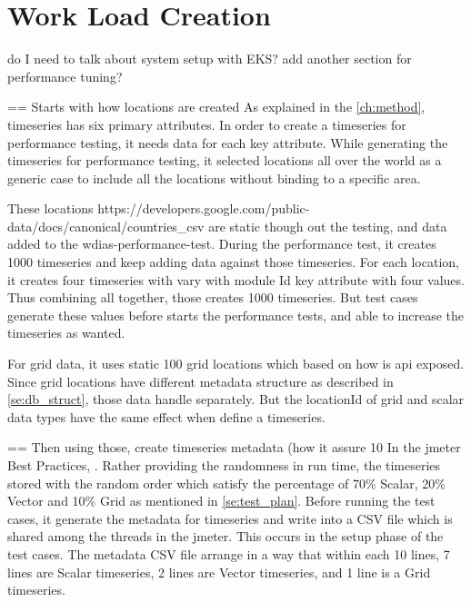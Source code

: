 \section{Work Load Creation}
do I need to talk about system setup with EKS?
add another section for performance tuning?

== Starts with how locations are created
As explained in the \ref{ch:method}, timeseries has six primary attributes. In order to create a timeseries for performance testing, it needs data for each key attribute.
While generating the timeseries for performance testing, it selected locations all over the world as a generic case to include all the locations without binding to a specific area.

These locations https://developers.google.com/public-data/docs/canonical/countries\_csv are static though out the testing, and data added to the wdias-performance-test.
During the performance test, it creates 1000 timeseries and keep adding data against those timeseries. For each location, it creates four timeseries with vary with module Id key attribute with four values. Thus combining all together, those creates 1000 timeseries. But test cases generate these values before starts the performance tests, and able to increase the timeseries as wanted.

For grid data, it uses static 100 grid locations which based on how is \acrshort{api} exposed. Since grid locations have different metadata structure as described in \ref{se:db_struct}, those data handle separately. But the locationId of grid and scalar data types have the same effect when define a timeseries.

== Then using those, create timeseries metadata (how it assure 10%
In the \acrshort{jmeter} Best Practices, . Rather providing the randomness in run time, the timeseries stored with the random order which satisfy the percentage of 70\% Scalar, 20\% Vector and 10\% Grid as mentioned in \ref{se:test_plan}.
Before running the test cases, it generate the metadata for timeseries and write into a CSV file which is shared among the threads in the \acrshort{jmeter}. This occurs in the setup phase of the test cases. The metadata CSV file arrange in a way that within each 10 lines, 7 lines are Scalar timeseries, 2 lines are Vector timeseries, and 1 line is a Grid timeseries.

